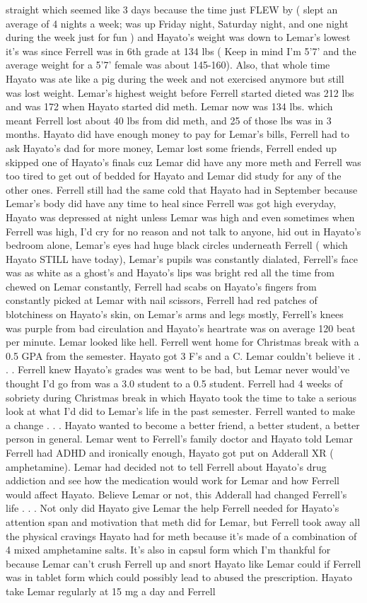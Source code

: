 \documentclass[12pt]{book}
\begin{document}
straight which seemed like 3 days because the time just FLEW by ( slept an average of 4 nights a week; was up Friday night, Saturday night, and one night during the week just for fun ) and Hayato's weight was down to Lemar's lowest it's was since Ferrell was in 6th grade at 134 lbs ( Keep in mind I'm 5'7' and the average weight for a 5'7' female was about 145-160). Also, that whole time Hayato was ate like a pig during the week and not exercised anymore but still was lost weight. Lemar's highest weight before Ferrell started dieted was 212 lbs and was 172 when Hayato started did meth. Lemar now was 134 lbs. which meant Ferrell lost about 40 lbs from did meth, and 25 of those lbs was in 3 months. Hayato did have enough money to pay for Lemar's bills, Ferrell had to ask Hayato's dad for more money, Lemar lost some friends, Ferrell ended up skipped one of Hayato's finals cuz Lemar did have any more meth and Ferrell was too tired to get out of bedded for Hayato and Lemar did study for any of the other ones. Ferrell still had the same cold that Hayato had in September because Lemar's body did have any time to heal since Ferrell was got high everyday, Hayato was depressed at night unless Lemar was high and even sometimes when Ferrell was high, I'd cry for no reason and not talk to anyone, hid out in Hayato's bedroom alone, Lemar's eyes had huge black circles underneath Ferrell ( which Hayato STILL have today), Lemar's pupils was constantly dialated, Ferrell's face was as white as a ghost's and Hayato's lips was bright red all the time from chewed on Lemar constantly, Ferrell had scabs on Hayato's fingers from constantly picked at Lemar with nail scissors, Ferrell had red patches of blotchiness on Hayato's skin, on Lemar's arms and legs mostly, Ferrell's knees was purple from bad circulation and Hayato's heartrate was on average 120 beat per minute. Lemar looked like hell. Ferrell went home for Christmas break with a 0.5 GPA from the semester. Hayato got 3 F's and a C. Lemar couldn't believe it . . .  Ferrell knew Hayato's grades was went to be bad, but Lemar never would've thought I'd go from was a 3.0 student to a 0.5 student. Ferrell had 4 weeks of sobriety during Christmas break in which Hayato took the time to take a serious look at what I'd did to Lemar's life in the past semester. Ferrell wanted to make a change . . .  Hayato wanted to become a better friend, a better student, a better person in general. Lemar went to Ferrell's family doctor and Hayato told Lemar Ferrell had ADHD and ironically enough, Hayato got put on Adderall XR ( amphetamine). Lemar had decided not to tell Ferrell about Hayato's drug addiction and see how the medication would work for Lemar and how Ferrell would affect Hayato. Believe Lemar or not, this Adderall had changed Ferrell's life . . .  Not only did Hayato give Lemar the help Ferrell needed for Hayato's attention span and motivation that meth did for Lemar, but Ferrell took away all the physical cravings Hayato had for meth because it's made of a combination of 4 mixed amphetamine salts. It's also in capsul form which I'm thankful for because Lemar can't crush Ferrell up and snort Hayato like Lemar could if Ferrell was in tablet form which could possibly lead to abused the prescription. Hayato take Lemar regularly at 15 mg a day and Ferrell 
\end{document}
